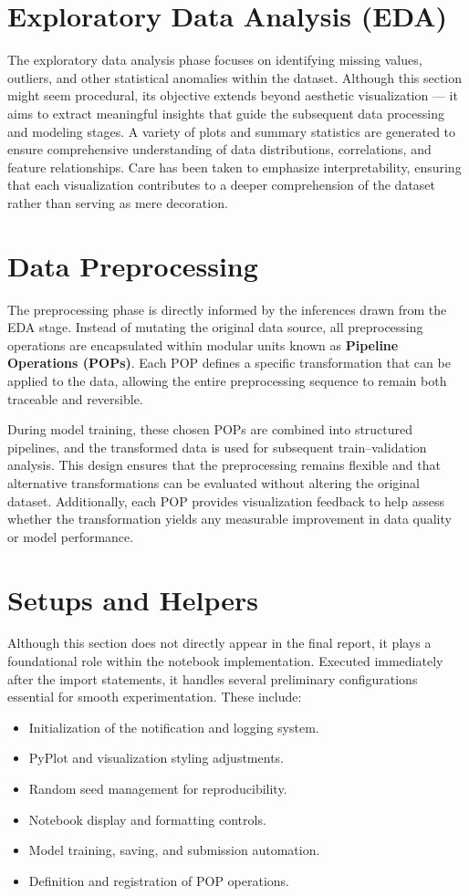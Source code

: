 \section{Exploratory Data Analysis (EDA)}\label{sec:exploratory-data-analysis}
The exploratory data analysis phase focuses on identifying missing values, outliers, and other statistical anomalies within the dataset.
Although this section might seem procedural, its objective extends beyond aesthetic visualization — it aims to extract meaningful insights that guide the subsequent data processing and modeling stages.
A variety of plots and summary statistics are generated to ensure comprehensive understanding of data distributions, correlations, and feature relationships.
Care has been taken to emphasize interpretability, ensuring that each visualization contributes to a deeper comprehension of the dataset rather than serving as mere decoration.


\section{Data Preprocessing}\label{sec:data-preprocessing}
The preprocessing phase is directly informed by the inferences drawn from the EDA stage.
Instead of mutating the original data source, all preprocessing operations are encapsulated within modular units known as \textbf{Pipeline Operations (POPs)}.
Each POP defines a specific transformation that can be applied to the data, allowing the entire preprocessing sequence to remain both traceable and reversible.

During model training, these chosen POPs are combined into structured pipelines, and the transformed data is used for subsequent train–validation analysis.
This design ensures that the preprocessing remains flexible and that alternative transformations can be evaluated without altering the original dataset.
Additionally, each POP provides visualization feedback to help assess whether the transformation yields any measurable improvement in data quality or model performance.


\section{Setups and Helpers}\label{sec:setups-and-helpers}
Although this section does not directly appear in the final report, it plays a foundational role within the notebook implementation.
Executed immediately after the import statements, it handles several preliminary configurations essential for smooth experimentation.
These include:
\begin{itemize}
    \item Initialization of the notification and logging system.
    \item PyPlot and visualization styling adjustments.
    \item Random seed management for reproducibility.
    \item Notebook display and formatting controls.
    \item Model training, saving, and submission automation.
    \item Definition and registration of POP operations.
\end{itemize}

